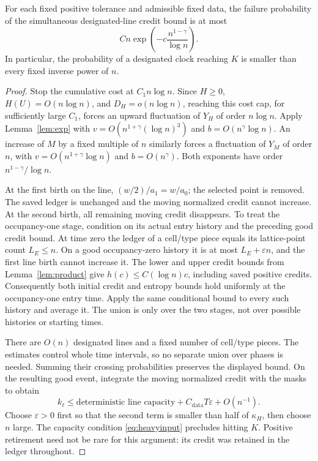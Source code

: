 \begin{proposition}\label{prop:clock}
For each fixed positive tolerance and admissible fixed data, the
failure probability of the simultaneous designated-line credit
bound is at most
\[
 Cn\exp\left(-c\frac{n^{1-\gamma}}{\log n}\right).
\]
In particular, the probability of a designated clock reaching \(K\)
is smaller than every fixed inverse power of \(n\).
\end{proposition}
\begin{proof}
Stop the cumulative cost at \(C_1n\log n\). Since \(H\ge0\),
\(H(U)=O(n\log n)\), and \(D_H=o(n\log n)\), reaching this cost
cap, for sufficiently large \(C_1\), forces an upward fluctuation
of \(Y_H\) of order \(n\log n\). Apply Lemma~\ref{lem:exp} with
\(v=O(n^{1+\gamma}(\log n)^3)\) and
\(b=O(n^\gamma\log n)\). An increase of \(M\) by a fixed multiple
of \(n\) similarly forces a fluctuation of \(Y_M\) of order \(n\),
with \(v=O(n^{1+\gamma}\log n)\) and \(b=O(n^\gamma)\).
Both exponents have order \(n^{1-\gamma}/\log n\).

At the first birth on the line,
\((w/2)/a_1=w/a_0\); the selected point is removed. The saved ledger
is unchanged and the moving normalized credit cannot increase.
At the second birth, all remaining moving credit disappears. To
treat the occupancy-one stage, condition on its actual entry history
and the preceding good credit bound. At time zero the ledger of a
cell/type piece equals its lattice-point count \(L_E\le n\).
On a good occupancy-zero history it is at most
\(L_E+\varepsilon n\), and the first line birth cannot increase it.
The lower and upper credit bounds from Lemma~\ref{lem:product}
give \(h(c)\le C(\log n)c\), including saved positive credits.
Consequently both initial credit and entropy bounds hold uniformly
at the occupancy-one entry time. Apply the same conditional bound
to every such history and average it. The union is only over the
two stages, not over possible histories or starting times.

There are \(O(n)\) designated lines and a fixed number of cell/type
pieces. The estimates control whole time intervals, so no separate
union over phases is needed. Summing their crossing probabilities preserves
the displayed bound. On the resulting good event, integrate the
moving normalized credit with the masks to obtain
\[
 k_\ell\le\text{deterministic line capacity}
             +C_{\mathrm{data}}T\varepsilon+O(n^{-1}).
\]
Choose \(\varepsilon>0\) first so that the second term is smaller
than half of \(\kappa_H\), then choose \(n\) large. The capacity
condition \eqref{eq:heavyinput} precludes hitting \(K\).
Positive retirement need not be rare for this argument: its credit
was retained in the ledger throughout.
\end{proof}

